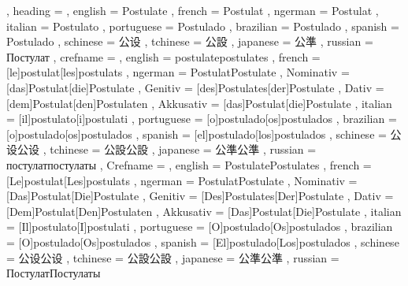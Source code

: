   {
    , heading =   {
                    , english     = Postulate
                    , french      = Postulat
                    , ngerman     = Postulat
                    , italian     = Postulato
                    , portuguese  = Postulado
                    , brazilian   = Postulado
                    , spanish     = Postulado
                    , schinese    = 公设
                    , tchinese    = 公設
                    , japanese    = 公準
                    , russian     = Постулат
                  }
    , crefname =  {
                    , english     = {postulate}{postulates}
                    , french      = [le]{postulat}[les]{postulats}
                    , ngerman     = { {Postulat}{Postulate}
                                      , Nominativ = [das]{Postulat}[die]{Postulate}
                                      , Genitiv   = [des]{Postulates}[der]{Postulate}
                                      , Dativ     = [dem]{Postulat}[den]{Postulaten}
                                      , Akkusativ = [das]{Postulat}[die]{Postulate}
                                    }
                    , italian     = [il]{postulato}[i]{postulati}
                    , portuguese  = [o]{postulado}[os]{postulados}
                    , brazilian   = [o]{postulado}[os]{postulados}
                    , spanish     = [el]{postulado}[los]{postulados}
                    , schinese    = {公设}{公设}
                    , tchinese    = {公設}{公設}
                    , japanese    = {公準}{公準}
                    , russian     = {постулат}{постулаты}
                  }
    , Crefname =  {
                    , english     = {Postulate}{Postulates}
                    , french      = [Le]{postulat}[Les]{postulats}
                    , ngerman     = { {Postulat}{Postulate}
                                      , Nominativ = [Das]{Postulat}[Die]{Postulate}
                                      , Genitiv   = [Des]{Postulates}[Der]{Postulate}
                                      , Dativ     = [Dem]{Postulat}[Den]{Postulaten}
                                      , Akkusativ = [Das]{Postulat}[Die]{Postulate}
                                    }
                    , italian     = [Il]{postulato}[I]{postulati}
                    , portuguese  = [O]{postulado}[Os]{postulados}
                    , brazilian   = [O]{postulado}[Os]{postulados}
                    , spanish     = [El]{postulado}[Los]{postulados}
                    , schinese    = {公设}{公设}
                    , tchinese    = {公設}{公設}
                    , japanese    = {公準}{公準}
                    , russian     = {Постулат}{Постулаты}
                  }
  }

